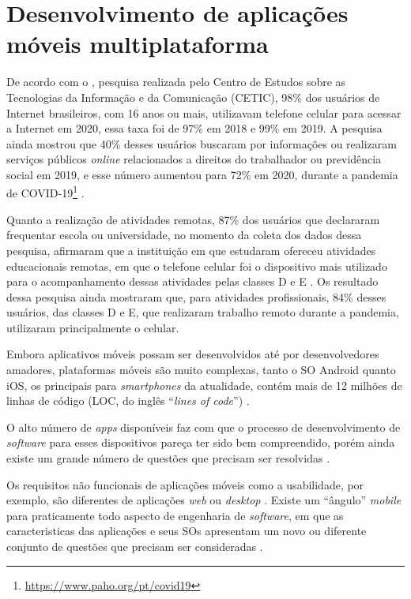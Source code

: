 \section{Desenvolvimento de aplicações móveis multiplataforma}

De acordo com o , pesquisa realizada pelo Centro de Estudos sobre
as Tecnologias da Informação e da Comunicação (CETIC), 98\% dos usuários de Internet brasileiros, com 16 anos ou mais,
utilizavam telefone celular para acessar a Internet em 2020, essa taxa foi de 97\% em 2018 e 99\% em 2019.
A pesquisa ainda mostrou que 40\% desses usuários buscaram por informações ou realizaram serviços públicos \emph{online} relacionados
a direitos do trabalhador ou previdência social em 2019, e esse número aumentou para 72\% em
2020, durante a pandemia de COVID-19\footnote{\url{https://www.paho.org/pt/covid19}} \cite{CETIC_2021}.

Quanto a realização de atividades remotas, 87\% dos usuários que declararam frequentar escola ou universidade, no momento da coleta
dos dados dessa pesquisa, afirmaram que a instituição em que estudaram ofereceu atividades educacionais remotas, em que o telefone
celular foi o dispositivo mais utilizado para o acompanhamento dessas atividades pelas classes D e E \cite{CETIC_2021}. Os resultado dessa pesquisa
ainda mostraram que, para atividades profissionais, 84\% desses usuários, das classes D e E, que realizaram trabalho remoto durante a pandemia,
utilizaram principalmente o celular.

Embora aplicativos móveis possam ser desenvolvidos até por desenvolvedores amadores, plataformas móveis são muito complexas, tanto o
SO Android quanto iOS, os principais para \emph{smartphones} da atualidade, contém mais de 12 milhões de linhas de código
(LOC, do inglês ``\emph{lines of code}'') \cite{pressman2014software}.

O alto número de \emph{apps} disponíveis faz com que o processo de desenvolvimento de \emph{software} para esses dispositivos pareça
ter sido bem compreendido, porém ainda existe um grande número de questões que precisam ser resolvidas \cite{pressman2014software,Wasserman2010}.

Os requisitos não funcionais de aplicações móveis como a usabilidade, por exemplo, são diferentes de aplicações \emph{web} ou \emph{desktop} \cite{pressman2014software}. 
Existe um ``ângulo'' \emph{mobile} para praticamente todo aspecto de engenharia de \emph{software}, em que as caracteristicas
das aplicações e seus SOs apresentam um novo ou diferente conjunto de questões que precisam ser consideradas \cite{Wasserman2010}.

